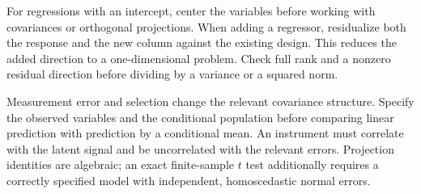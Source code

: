 For regressions with an intercept, center the variables before working with covariances or orthogonal projections. When adding a regressor, residualize both the response and the new column against the existing design. This reduces the added direction to a one-dimensional problem. Check full rank and a nonzero residual direction before dividing by a variance or a squared norm.

Measurement error and selection change the relevant covariance structure. Specify the observed variables and the conditional population before comparing linear prediction with prediction by a conditional mean. An instrument must correlate with the latent signal and be uncorrelated with the relevant errors. Projection identities are algebraic; an exact finite-sample $t$ test additionally requires a correctly specified model with independent, homoscedastic normal errors.
\par\smallskip
